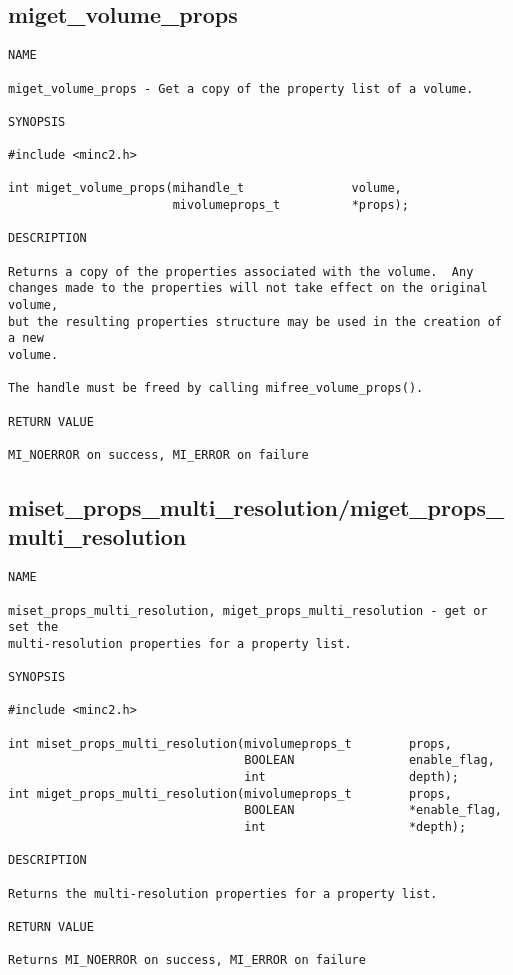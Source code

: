 \documentclass{article}
\begin{document}
\subsection{miget\_volume\_props}
\begin{verbatim}
NAME

miget_volume_props - Get a copy of the property list of a volume.

SYNOPSIS

#include <minc2.h>

int miget_volume_props(mihandle_t               volume, 
                       mivolumeprops_t          *props);

DESCRIPTION

Returns a copy of the properties associated with the volume.  Any
changes made to the properties will not take effect on the original volume,
but the resulting properties structure may be used in the creation of a new
volume.

The handle must be freed by calling mifree_volume_props().

RETURN VALUE

MI_NOERROR on success, MI_ERROR on failure
\end{verbatim}

\subsection{miset\_props\_multi\_resolution/miget\_props\_multi\_resolution}
\begin{verbatim}
NAME

miset_props_multi_resolution, miget_props_multi_resolution - get or set the
multi-resolution properties for a property list.

SYNOPSIS

#include <minc2.h>

int miset_props_multi_resolution(mivolumeprops_t        props, 
                                 BOOLEAN                enable_flag,
                                 int                    depth);
int miget_props_multi_resolution(mivolumeprops_t        props, 
                                 BOOLEAN                *enable_flag,
                                 int                    *depth);

DESCRIPTION

Returns the multi-resolution properties for a property list.

RETURN VALUE

Returns MI_NOERROR on success, MI_ERROR on failure
\end{verbatim}
\end{document}
